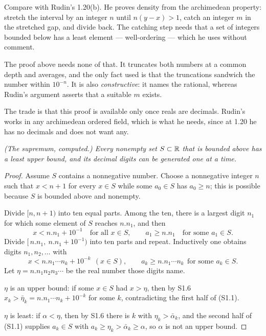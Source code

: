 \begin{deeper}
Compare with Rudin's 1.20(b). He proves density from the archimedean
property: stretch the interval by an integer $n$ until $n(y-x)>1$, catch an
integer $m$ in the stretched gap, and divide back. The catching step needs
that a set of integers bounded below has a least element --- well-ordering
--- which he uses without comment.

The proof above needs none of that. It truncates both numbers at a common
depth and averages, and the only fact used is that the truncations sandwich
the number within $10^{-n}$. It is also \emph{constructive}: it names the
rational, whereas Rudin's argument asserts that a suitable $m$ exists.

The trade is that this proof is available only once reals are decimals.
Rudin's works in any archimedean ordered field, which is what he needs, since
at 1.20 he has no decimals and does not want any.
\end{deeper}

\emph{(The supremum, computed.) Every nonempty set $S \subset \mathbb{R}$ that is
bounded above has a least upper bound, and its decimal digits can be
generated one at a time.}

\begin{proof}
Assume $S$ contains a nonnegative number. Choose a nonnegative integer $n$
such that $x < n+1$ for every $x \in S$ while some $a_0 \in S$ has
$a_0 \ge n$; this is possible because $S$ is bounded above and nonempty.

Divide $[n, n+1)$ into ten equal parts. Among the ten, there is a largest
digit $n_1$ for which some element of $S$ reaches $n.n_1$, and then
\[ x < n.n_1 + 10^{-1} \quad\text{for all } x \in S,
   \qquad a_1 \ge n.n_1 \quad\text{for some } a_1 \in S. \]
Divide $[\,n.n_1,\ n.n_1 + 10^{-1})$ into ten parts and repeat. Inductively
one obtains digits $n_1, n_2, \dots$ with
\begin{equation}
  x < n.n_1\cdots n_k + 10^{-k}\ \ (x \in S), \qquad
  a_k \ge n.n_1\cdots n_k \ \ \text{for some } a_k \in S. \tag{S1.1}
\end{equation}
Let $\eta = n.n_1n_2n_3\cdots$ be the real number those digits name.

$\eta$ is an upper bound: if some $x \in S$ had $x > \eta$, then by S1.6
$x_k > \bar\eta_k = n.n_1\cdots n_k + 10^{-k}$ for some $k$, contradicting the
first half of (S1.1).

$\eta$ is least: if $\alpha < \eta$, then by S1.6 there is $k$ with
$\eta_k > \bar\alpha_k$, and the second half of (S1.1) supplies $a_k \in S$
with $a_k \ge \eta_k > \bar\alpha_k \ge \alpha$, so $\alpha$ is not an upper
bound.
\end{proof}

